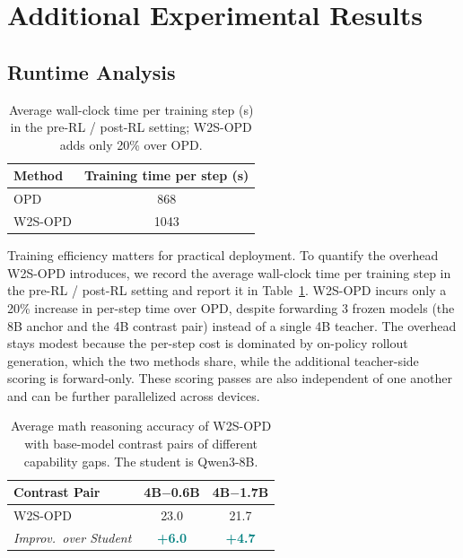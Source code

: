 \documentclass{article}
\newcommand{\imp}[1]{\textcolor{teal}{\textbf{+#1}}}
\newcommand\ours{W2S-OPD\xspace}
\begin{document}
\section{Additional Experimental Results}
\subsection{Runtime Analysis}
\begin{table}
\vspace{-20pt}
\caption{Average wall-clock time per training step (s) in the pre-RL / post-RL setting; \ours adds only 20\% over OPD.}
\label{tab:efficiency}
\vspace{5pt}
\centering
\begin{tabular}{lc}
\toprule
\textbf{Method} & \textbf{Training time per step (s)}  \\
\midrule
OPD & 868\\
\ours & 1043\\
\bottomrule
\end{tabular}

\vspace{-5pt}
\end{table}
Training efficiency matters for practical deployment. To quantify the overhead \ours introduces, we record the average wall-clock time per training step in the pre-RL / post-RL setting and report it in Table~\ref{tab:efficiency}. \ours incurs only a 20\% increase in per-step time over OPD, despite forwarding 3 frozen models (the 8B anchor and the 4B contrast pair) instead of a single 4B teacher. The overhead stays modest because the per-step cost is dominated by on-policy rollout generation, which the two methods share, while the additional teacher-side scoring is forward-only. These scoring passes are also independent of one another and can be further parallelized across devices.

\begin{table}
\centering
\vspace{-20pt}
\caption{Average math reasoning accuracy of \ours with base-model contrast pairs of different capability gaps. The student is Qwen3-8B.}
\vspace{5pt}
\label{tab:base_scale}
\begin{tabular}{lcc}
\toprule
\textbf{Contrast Pair} & 4B$-$0.6B & 4B$-$1.7B \\
\midrule
\rowcolor{oursbg}
\ours & 23.0 & 21.7 \\
\textit{Improv.\ over Student} & \imp{6.0} & \imp{4.7} \\
\bottomrule
\end{tabular}
\end{table}
\end{document}
